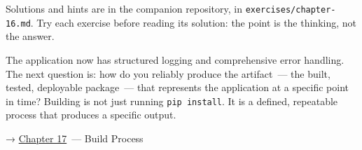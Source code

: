 \noindent{}Solutions and hints are in the companion repository, in \texttt{exercises/}\allowbreak{}\texttt{chapter-16.md}. Try each exercise before reading its solution: the point is the thinking, not the answer.

\label{16-logging-error-handling:whats-next}

The application now has structured logging and comprehensive error handling. The next question is: how do you reliably produce the artifact~--- the built, tested, deployable package~--- that represents the application at a specific point in time? Building is not just running \texttt{pip\ install}. It is a defined, repeatable process that produces a specific output.

\noindent{}→ \hyperref[ch:17-build-process]{Chapter 17}~--- Build Process
